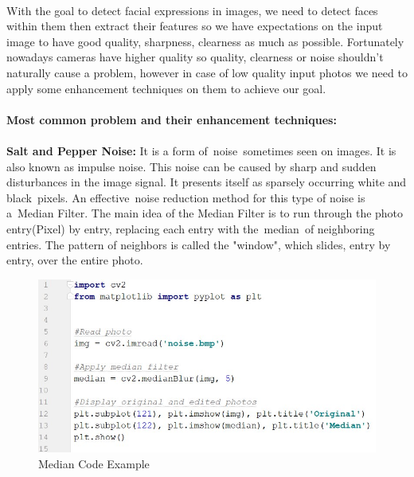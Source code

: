 \paragraph{}
With the goal to detect facial expressions in images, we need to detect faces within them then extract their features so we have expectations on the input image to have good quality, sharpness, clearness as much as possible.\newline
Fortunately nowadays cameras have higher quality so quality, clearness or noise shouldn’t naturally cause a problem, however in case of low quality input photos we need to apply some enhancement techniques on them to achieve our goal.

\paragraph{}
\textbf{Most common problem and their enhancement techniques:}\newline

\paragraph{}
\textbf{Salt and Pepper Noise:}\newline
It is a form of noise sometimes seen on images. It is also known as impulse noise. This noise can be caused by sharp and sudden disturbances in the image signal. It presents itself as sparsely occurring white and black pixels.\newline
An effective noise reduction method for this type of noise is a Median Filter.\newline
The main idea of the Median Filter is to run through the photo entry(Pixel) by entry, replacing each entry with the median of neighboring entries. The pattern of neighbors is called the "window", which slides, entry by entry, over the entire photo.

\begin{figure}[H]
	\centering
	\includegraphics[width=\linewidth]{median_code.jpg}
	\caption{Median Code Example}
\end{figure}

